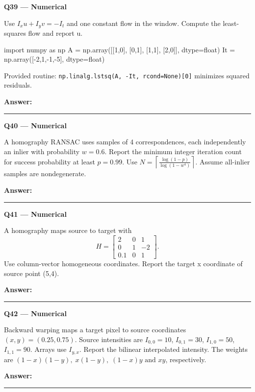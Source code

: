 \documentclass[11pt,a4paper]{article}
\begin{document}
\par\vspace{12pt}
\begin{minipage}{\linewidth}
\textbf{Q39 — Numerical}\par\smallskip
Use \(I_x u+I_y v=-I_t\) and one constant flow in the window. Compute the least-squares flow and report u.


\begin{Code}
import numpy as np
A = np.array([[1,0], [0,1], [1,1], [2,0]], dtype=float)
It = np.array([-2,1,-1,-5], dtype=float)
\end{Code}


Provided routine: \texttt{np.linalg.lstsq(A,\allowbreak{} -It,\allowbreak{} rcond=\allowbreak{}None)[0]} minimizes squared residuals.
\par\medskip\textbf{Answer:} \rule{55mm}{0.4pt}
\end{minipage}
\par\vspace{12pt}
\begin{minipage}{\linewidth}
\textbf{Q40 — Numerical}\par\smallskip
A homography RANSAC uses samples of 4 correspondences,\allowbreak{} each independently an inlier with probability \(w=0.6\). Report the minimum integer iteration count for success probability at least \(p=0.99\). Use \(N=\left\lceil\frac{\log(1-p)}{\log(1-w^4)}\right\rceil\). Assume all-inlier samples are nondegenerate.
\par\medskip\textbf{Answer:} \rule{55mm}{0.4pt}
\end{minipage}
\par\vspace{12pt}
\begin{minipage}{\linewidth}
\textbf{Q41 — Numerical}\par\smallskip
A homography maps source to target with
\[H=\begin{bmatrix}2&0&1\\0&1&-2\\0.1&0&1\end{bmatrix}.\]
 Use column-vector homogeneous coordinates. Report the target x coordinate of source point (5,\allowbreak{}4).
\par\medskip\textbf{Answer:} \rule{55mm}{0.4pt}
\end{minipage}
\par\vspace{12pt}
\begin{minipage}{\linewidth}
\textbf{Q42 — Numerical}\par\smallskip
Backward warping maps a target pixel to source coordinates \((x,y)=(0.25,0.75)\). Source intensities are \(I_{0,0}=10\),\allowbreak{} \(I_{0,1}=30\),\allowbreak{} \(I_{1,0}=50\),\allowbreak{} \(I_{1,1}=90\). Arrays use \(I_{y,x}\). Report the bilinear interpolated intensity. The weights are \((1-x)(1-y),\;x(1-y),\;(1-x)y\text{ and }xy\),\allowbreak{} respectively.
\par\medskip\textbf{Answer:} \rule{55mm}{0.4pt}
\end{minipage}
\end{document}
